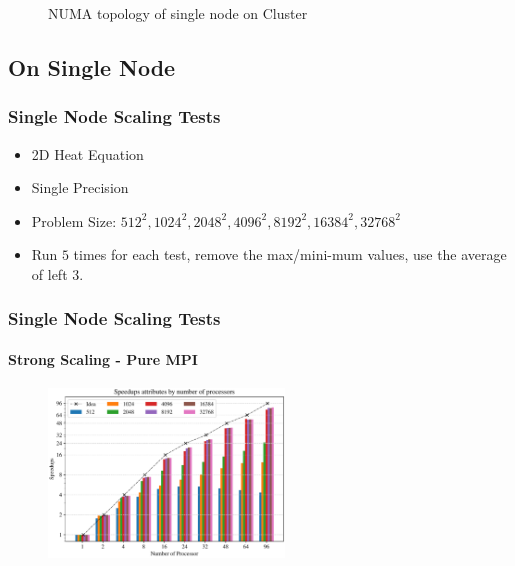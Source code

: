 \begin{frame}
\begin{figure}[htbp]
    \caption{NUMA topology of single node on Cluster}
    \label{FIG_Topology_Callan}
  \end{figure}

\end{frame}


\subsection{On Single Node}
\begin{frame}
  \frametitle{Single Node Scaling Tests}
  \begin{itemize}
    \item 2D Heat Equation
    \item Single Precision 
    \item Problem Size: $512^2, 1024^2, 2048^2, 4096^2, 8192^2, 16384^2, 32768^2$
    \item Run $5$ times for each test, remove the max/mini-mum values, use the average of left $3$.
  \end{itemize}
  
  
  




\end{frame}


\begin{frame}
  \frametitle{Single Node Scaling Tests}
  \framesubtitle{Strong Scaling - Pure MPI}
  \begin{figure}[htbp]
    \centering
    \includegraphics[width=0.56\textwidth]{figure/FIG_Benchmark_pure_mpi.pdf}
    \label{FIG:Benchmark:PURE_MPI}
  \end{figure}
\end{frame}



